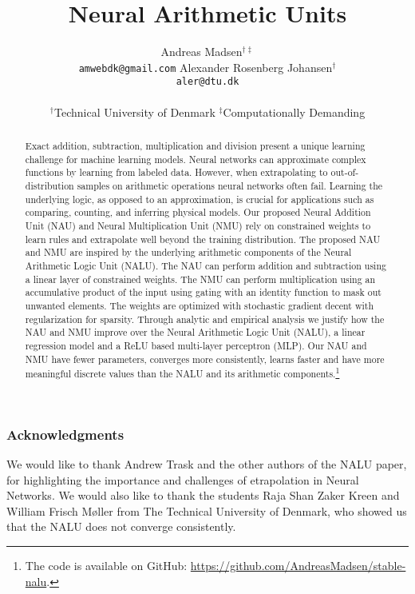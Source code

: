 \documentclass{article}
\title{Neural Arithmetic Units}
\author{%
  Andreas Madsen$^{\dag\ddag}$ \\
  \texttt{amwebdk@gmail.com}
  \AND
  Alexander Rosenberg Johansen$^{\dag}$ \\
  \texttt{aler@dtu.dk} \\
  \\
$^\dag$Technical University of Denmark \quad
$^\ddag$Computationally Demanding
}
\def\nonanonymous{}
\begin{document}
\maketitle

\begin{abstract}
Exact addition, subtraction, multiplication and division present a unique learning challenge for machine learning models.
Neural networks can approximate complex functions by learning from labeled data.
However, when extrapolating to out-of-distribution samples on arithmetic operations neural networks often fail. Learning the underlying logic, as opposed to an approximation, is crucial for applications such as comparing, counting, and inferring physical models.
Our proposed Neural Addition Unit (NAU) and Neural Multiplication Unit (NMU) rely on constrained weights to learn rules and extrapolate well beyond the training distribution.
The proposed NAU and NMU are inspired by the underlying arithmetic components of the Neural Arithmetic Logic Unit (NALU).
The NAU can perform addition and subtraction using a linear layer of constrained weights.
The NMU can perform multiplication using an accumulative product of the input using gating with an identity function to mask out unwanted elements.
The weights are optimized with stochastic gradient decent with regularization for sparsity.
Through analytic and empirical analysis we justify how the NAU and NMU improve over the Neural Arithmetic Logic Unit (NALU), a linear regression model and a ReLU based multi-layer perceptron (MLP).
Our NAU and NMU have fewer parameters, converges more consistently, learns faster and have more meaningful discrete values than the NALU and its arithmetic components.\ifdefined\nonanonymous\footnote{The code is available on GitHub: \url{https://github.com/AndreasMadsen/stable-nalu}.}\fi
\end{abstract}







\clearpage
\ifdefined\nonanonymous
\subsubsection*{Acknowledgments}
We would like to thank Andrew Trask and the other authors of the NALU paper, for highlighting the importance and challenges of etrapolation in Neural Networks. We would also like to thank the students Raja Shan Zaker Kreen and William Frisch Møller from The Technical University of Denmark, who showed us that the NALU does not converge consistently.
\fi




\newpage
\appendix

\clearpage

\clearpage

\clearpage
\end{document}
